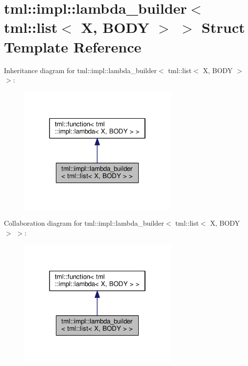 \hypertarget{structtml_1_1impl_1_1lambda__builder_3_01tml_1_1list_3_01_x_00_01_b_o_d_y_01_4_01_4}{\section{tml\+:\+:impl\+:\+:lambda\+\_\+builder$<$ tml\+:\+:list$<$ X, B\+O\+D\+Y $>$ $>$ Struct Template Reference}
\label{structtml_1_1impl_1_1lambda__builder_3_01tml_1_1list_3_01_x_00_01_b_o_d_y_01_4_01_4}
}


Inheritance diagram for tml\+:\+:impl\+:\+:lambda\+\_\+builder$<$ tml\+:\+:list$<$ X, B\+O\+D\+Y $>$ $>$\+:
\nopagebreak
\begin{figure}[H]
\begin{center}
\leavevmode
\includegraphics[width=226pt]{structtml_1_1impl_1_1lambda__builder_3_01tml_1_1list_3_01_x_00_01_b_o_d_y_01_4_01_4__inherit__graph}
\end{center}
\end{figure}


Collaboration diagram for tml\+:\+:impl\+:\+:lambda\+\_\+builder$<$ tml\+:\+:list$<$ X, B\+O\+D\+Y $>$ $>$\+:
\nopagebreak
\begin{figure}[H]
\begin{center}
\leavevmode
\includegraphics[width=226pt]{structtml_1_1impl_1_1lambda__builder_3_01tml_1_1list_3_01_x_00_01_b_o_d_y_01_4_01_4__coll__graph}
\end{center}
\end{figure}

